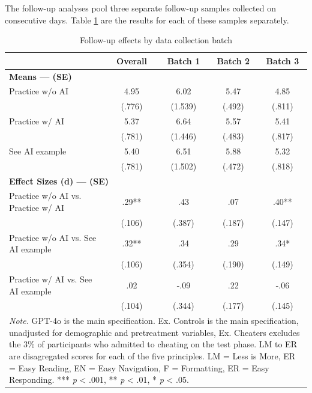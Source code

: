 \documentclass[11pt]{report}
\begin{document}
\begin{append}
The follow-up analyses pool three separate follow-up samples collected on consecutive days. Table \ref{tab:s3_followup_batches} are the results for each of these samples separately.

\begin{table}[h]
    \centering
        \caption{Follow-up effects by data collection batch}

\begin{tabular}{lcccc}
\toprule
  & Overall & Batch 1 & Batch 2 & Batch 3 \\ 
\midrule
\multicolumn{5}{l}{\textbf{Means --- (SE)}} \\ 
\midrule
Practice w/o AI & 4.95 & 6.02 & 5.47 & 4.85 \\ 
 & (.776) & (1.539) & (.492) & (.811) \\ 
Practice w/ AI & 5.37 & 6.64 & 5.57 & 5.41 \\ 
 & (.781) & (1.446) & (.483) & (.817) \\ 
See AI example & 5.40 & 6.51 & 5.88 & 5.32 \\ 
 & (.781) & (1.502) & (.472) & (.818) \\ 
\midrule
\multicolumn{5}{l}{\textbf{Effect Sizes (d) --- (SE)}} \\ 
\midrule
Practice w/o AI vs. Practice w/ AI & .29** & .43 & .07 & .40** \\ 
 & (.106) & (.387) & (.187) & (.147) \\ 
Practice w/o AI vs. See AI example & .32** & .34 & .29 & .34* \\ 
 & (.106) & (.354) & (.190) & (.149) \\ 
Practice w/ AI vs. See AI example & .02 & -.09 & .22 & -.06 \\ 
 & (.104) & (.344) & (.177) & (.145) \\ 
\midrule
\multicolumn{5}{p{10cm}}{\textit{Note.} GPT-4o is the main specification. Ex. Controls is the main specification, unadjusted for demographic and pretreatment variables, Ex. Cheaters excludes the 3\% of participants who admitted to cheating on the test phase. LM to ER are disagregated scores for each of the five principles. LM = Less is More, ER = Easy Reading, EN = Easy Navigation, F = Formatting, ER = Easy Responding. *** \textit{p} < .001, ** \textit{p} < .01, * \textit{p} < .05.}
\vspace{5pt}
\end{tabular}
    \label{tab:s3_followup_batches}
\end{table}

\FloatBarrier


\end{append}
\end{document}
